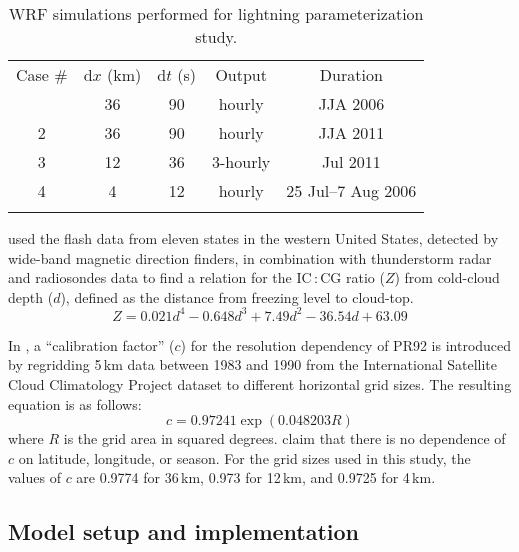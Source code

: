 	\begin{table}
		\centering
		\begin{singlespacing}
		\caption[WRF lightning simulations setups]{WRF simulations performed for lightning parameterization study.}
		\begin{tabular}{ccccc} \tophline
		Case \# & d$x$ (km) & d$t$ (\unit{s}) & Output &
		Duration \\
		\middlehline
		1 & 36 & 90 & hourly & JJA 2006 \\
		2 & 36 & 90 & hourly & JJA 2011 \\
		3 & 12 & 36 & 3-hourly &Jul 2011 \\
		4 & 4 & 12 & hourly &25 Jul--7 Aug 2006 \\
		\bottomhline
		\end{tabular}
		\label{tab:lightning/setup}
		\end{singlespacing}
	\end{table}

\citet{Price:1993fk} used the flash data from eleven states in the western
United States, detected by wide-band magnetic direction finders, in
combination with thunderstorm radar and radiosondes data to find a relation
for the IC\,:\,CG ratio ($Z$) from cold-cloud depth ($d$), defined as the
distance from freezing level to cloud-top.
\begin{equation}\label{eq:Z}
Z = 0.021d^4-0.648d^3+7.49d^2-36.54d + 63.09
\end{equation}

In \citet{Price:1994fk}, a ``calibration factor'' ($c$) for the resolution
dependency of PR92 is introduced by regridding 5\,\unit{km} data between 1983
and 1990 from the International Satellite Cloud Climatology Project dataset
\citep[ISCCP;][]{Rossow:1991aa} to different horizontal grid sizes. The
resulting equation is as follows:
      \begin{equation}\label{eq:calib}
            c = 0.97241\exp(0.048203R)
      \end{equation}
where $R$ is the grid area in squared degrees. \citet{Price:1994fk} claim
that there is no dependence of $c$ on latitude, longitude, or season. For the
grid sizes used in this study, the values of $c$ are 0.9774 for
36\,\unit{km}, 0.973 for 12\,\unit{km}, and 0.9725 for 4\,\unit{km}.

\subsection{Model setup and implementation}\label{ssec:lightning/model}

